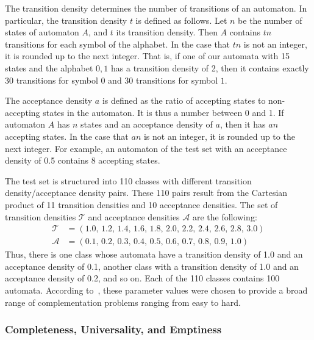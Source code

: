 The transition density determines the number of transitions of an automaton. In particular, the transition density $t$ is defined as follows. Let $n$ be the number of states of automaton $A$, and $t$ its transition density. Then $A$ contains $tn$ transitions for each symbol of the alphabet. In the case that $tn$ is not an integer, it is rounded up to the next integer. That is, if one of our automata with 15 states and the alphabet ${0, 1}$ has a transition density of 2, then it contains exactly 30 transitions for symbol $0$ and 30 transitions for symbol $1$. %

The acceptance density $a$ is defined as the ratio of accepting states to non-accepting states in the automaton. It is thus a number between 0 and 1. If automaton $A$ has $n$ states and an acceptance density of $a$, then it has $an$ accepting states. In the case that $an$ is not an integer, it is rounded up to the next integer. For example, an automaton of the test set with an acceptance density of 0.5 contains 8 accepting states. %

The \goal{} test set is structured into 110 classes with different transition density/acceptance density pairs. These 110 pairs result from the Cartesian product of 11 transition densities and 10 acceptance densities. The set of  transition densities $\mathcal T$ and acceptance densities $\mathcal A$ are the following:
\begin{align*}
\mathcal T & = \left( 1.0,\,1.2,\,1.4,\,1.6,\,1.8,\,2.0,\,2.2,\,2.4,\,2.6,\,2.8,\,3.0 \right) \\
\mathcal A & = \left( 0.1,\,0.2,\,0.3,\,0.4,\,0.5,\,0.6,\,0.7,\,0.8,\,0.9,\,1.0 \right)
\end{align*}
Thus, there is one class whose automata have a transition density of 1.0 and an acceptance density of 0.1, another class with a transition density of 1.0 and an acceptance density of 0.2, and so on. Each of the 110 classes contains 100 automata. According to~\cite{2011_tsai}, these parameter values were chosen to provide a broad range of complementation problems ranging from easy to hard.


\subsubsection{Completeness, Universality, and Emptiness}

